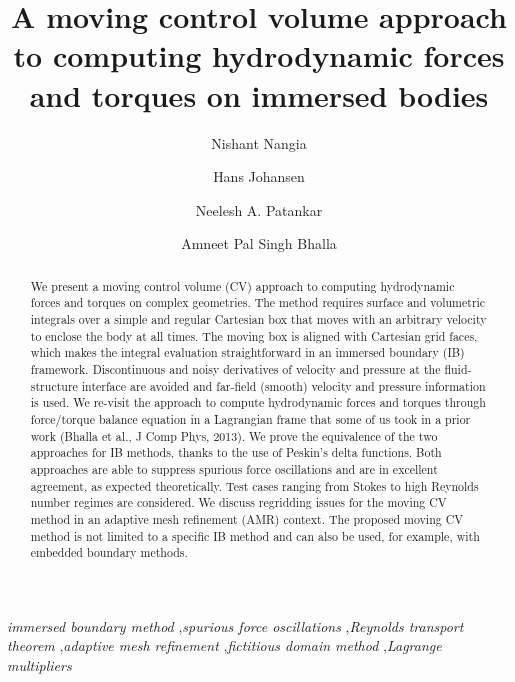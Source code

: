 \documentclass[review]{elsarticle}
\begin{document}
\begin{frontmatter}
	
\title{A moving control volume approach to computing hydrodynamic forces and torques on immersed bodies}

\author[Northwestern1]{Nishant Nangia}
\author[LBNL]{Hans Johansen}
\author[Northwestern1,Northwestern2]{Neelesh A. Patankar}
\author[LBNL]{Amneet Pal Singh Bhalla}

\address[Northwestern1]{Department of Engineering Sciences and Applied Mathematics, Northwestern University, Evanston, IL}
\address[Northwestern2]{Department of Mechanical Engineering, Northwestern University, Evanston, IL}
\address[LBNL]{Applied Numerical Algorithms Group, Lawrence Berkeley National Laboratory, Berkeley, CA}

\begin{abstract}
We present a moving control volume (CV) approach to computing hydrodynamic forces 
and torques on complex geometries. The method requires surface and volumetric 
integrals over a simple and regular Cartesian box that moves with an arbitrary 
velocity to enclose the body at all times. The moving box is aligned with Cartesian 
grid faces, which makes the integral evaluation straightforward in an  
immersed boundary (IB) framework. Discontinuous and noisy derivatives of velocity 
and pressure at the fluid-structure interface are avoided and far-field (smooth) velocity and 
pressure information is used. We re-visit the approach to compute 
hydrodynamic forces and torques through force/torque balance equation 
in a Lagrangian frame that some of us took in a prior work (Bhalla et al., J Comp Phys, 2013). 
We prove the equivalence of the two approaches for IB methods, thanks to 
the use of Peskin's delta functions. Both approaches are able to suppress 
spurious force oscillations and are in excellent agreement, as expected 
theoretically. Test cases ranging from Stokes to high Reynolds number regimes 
are considered. We discuss regridding issues for the moving CV method in an adaptive 
mesh refinement (AMR) context. The proposed moving CV method is not 
limited to a specific IB method and can also be used, for example, with embedded 
boundary methods.
\end{abstract}

\begin{keyword}
\emph{immersed boundary method} \sep \emph{spurious force oscillations} \sep \emph{Reynolds transport theorem} 
\sep \emph{adaptive mesh refinement} \sep \emph{fictitious domain method} \sep \emph{Lagrange multipliers}
\end{keyword}

\end{frontmatter}
\end{document}
